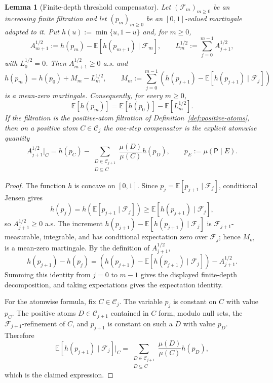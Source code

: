 \documentclass{etds}%
\numberwithin{equation}{section}
\theoremstyle{plain}
\newtheorem{lemma}[theorem]{Lemma}
\theoremstyle{definition}
\theoremstyle{remark}
\newcommand{\EE}{\mathbb{E}}
\begin{document}
\begin{lemma}[Finite-depth threshold compensator]
\label{lem:finite-depth-threshold-compensator}
Let $(\mathcal{F}_m)_{m\ge0}$ be an increasing finite filtration and let
$(p_m)_{m\ge0}$ be an $[0,1]$-valued martingale adapted to it.  Put
$h(u):=\min\{u,1-u\}$ and, for $m\ge0$,
\[
A_{m+1}^{1/2}
:=h(p_m)-\EE[h(p_{m+1})\mid\mathcal{F}_m],
\qquad
L_m^{1/2}:=\sum_{j=0}^{m-1}A_{j+1}^{1/2},
\]
with $L_0^{1/2}=0$.  Then $A_{m+1}^{1/2}\ge0$ a.s. and
\[
h(p_m)=h(p_0)+M_m-L_m^{1/2},
\qquad
M_m:=\sum_{j=0}^{m-1}
\left(h(p_{j+1})-\EE[h(p_{j+1})\mid\mathcal{F}_j]\right)
\]
is a mean-zero martingale.  Consequently, for every $m\ge0$,
\[
\EE[h(p_m)]=\EE[h(p_0)]-\EE[L_m^{1/2}].
\]
If the filtration is the positive-atom filtration of
Definition~\ref{def:positive-atoms}, then on a positive atom
$C\in\mathcal{C}_j$ the one-step compensator is the explicit atomwise quantity
\[
A_{j+1}^{1/2}\big|_C
=h(p_C)-
\sum_{\substack{D\in\mathcal{C}_{j+1}\\D\subseteq C}}
\frac{\mu(D)}{\mu(C)}h(p_D),
\qquad p_E:=\mu(\mathsf{P}\mid E).
\]
\end{lemma}

\begin{proof}
The function $h$ is concave on $[0,1]$.  Since
$p_j=\EE[p_{j+1}\mid\mathcal{F}_j]$, conditional Jensen gives
\[
h(p_j)=h(\EE[p_{j+1}\mid\mathcal{F}_j])
\ge \EE[h(p_{j+1})\mid\mathcal{F}_j],
\]
so $A_{j+1}^{1/2}\ge0$ a.s.  The increment
$h(p_{j+1})-\EE[h(p_{j+1})\mid\mathcal{F}_j]$ is
$\mathcal{F}_{j+1}$-measurable, integrable, and has conditional expectation
zero over $\mathcal{F}_j$; hence $M_m$ is a mean-zero martingale.
By the definition of $A_{j+1}^{1/2}$,
\[
h(p_{j+1})-h(p_j)
=\left(h(p_{j+1})-\EE[h(p_{j+1})\mid\mathcal{F}_j]\right)
-A_{j+1}^{1/2}.
\]
Summing this identity from $j=0$ to $m-1$ gives the displayed finite-depth
decomposition, and taking expectations gives the expectation identity.

For the atomwise formula, fix $C\in\mathcal{C}_j$.  The variable $p_j$ is
constant on $C$ with value $p_C$.  The positive atoms
$D\in\mathcal{C}_{j+1}$ contained in $C$ form, modulo null sets, the
$\mathcal{F}_{j+1}$-refinement of $C$, and $p_{j+1}$ is constant on such a
$D$ with value $p_D$.  Therefore
\[
\EE[h(p_{j+1})\mid\mathcal{F}_j]\big|_C
=\sum_{\substack{D\in\mathcal{C}_{j+1}\\D\subseteq C}}
\frac{\mu(D)}{\mu(C)}h(p_D),
\]
which is the claimed expression.
\end{proof}
\end{document}
